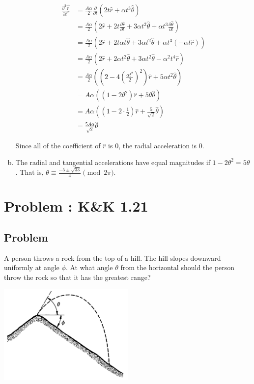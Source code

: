 \documentclass[solutions]{esg8012pset}
\begin{document}
\begin{enumerate}[a.]
\begin{align*}
            \\
            \frac{\partial^2 \vec r}{\partial t^2} & = \frac{A\alpha}{2}\frac{\partial}{\partial t}\left( 2t\hat r + \alpha t^3 \hat \theta\right) \\
            & = \frac{A\alpha}{2}\left( 2\hat r + 2t\frac{\partial \hat r}{\partial t} + 3\alpha t^2 \hat \theta + \alpha t^3\frac{\partial \hat \theta}{\partial t}\right) \\
            & = \frac{A\alpha}{2}\left( 2\hat r + 2t\alpha t \hat \theta + 3\alpha t^2 \hat \theta + \alpha t^3(-\alpha t \hat r)\right) \\
            & = \frac{A\alpha}{2}\left( 2\hat r + 2\alpha t^2 \hat \theta + 3\alpha t^2 \hat \theta - \alpha^2 t^4\hat r\right) \\
            & = \frac{A\alpha}{2}\left( \left(2- 4\left(\frac{\alpha t^2}{2}\right)^2\right)\hat r + 5\alpha t^2\hat \theta \right) \\
            & = A\alpha\left( \left(1- 2\theta^2\right)\hat r + 5\theta\hat \theta \right) \\
            & = A\alpha\left( \left(1- 2\cdot\frac{1}{2}\right)\hat r + \frac{5}{\sqrt{2}}\hat \theta \right) \\
            & = \frac{5A\alpha}{\sqrt{2}}\hat \theta
          \end{align*} \par
          Since all of the coefficient of $\hat r$ is 0, the radial acceleration is 0.
    \item  The radial and tangential accelerations have equal magnitudes if $1- 2\theta^2 = 5\theta$.  That is, $\theta \equiv \frac{-5\pm\sqrt{33}}{4}\pmod{2\pi}$.
  \end{enumerate}
\section{Problem \thesection: K\&K 1.21}
\subsection{Problem}
  A person throws a rock from the top of a hill. The hill slopes downward uniformly at angle $\phi$. At
  what angle $\theta$ from the horizontal should the person throw the rock so that it has the greatest
  range?
  \begin{center}\includegraphics[width=0.5\textwidth]{ps01_4}\end{center}
\end{document}
